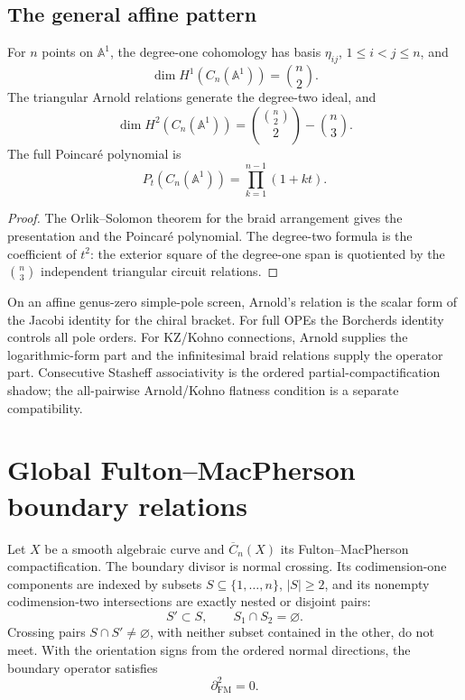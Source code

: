 \subsection{\texorpdfstring{The general affine pattern}{The general affine pattern}}

\begin{theorem}\label{thm:arnold-general-n}
For \(n\) points on \(\mathbb{A}^1\), the degree-one cohomology has
basis \(\eta_{ij}\), \(1\leq i<j\leq n\), and
\[
\dim H^1(C_n(\mathbb{A}^1))=\binom{n}{2}.
\]
The triangular Arnold relations generate the degree-two ideal, and
\[
\dim H^2(C_n(\mathbb{A}^1))
=
\binom{\binom{n}{2}}{2}-\binom{n}{3}.
\]
The full Poincar\'e polynomial is
\[
P_t(C_n(\mathbb{A}^1))=\prod_{k=1}^{n-1}(1+kt).
\]
\end{theorem}

\begin{proof}
The Orlik--Solomon theorem for the braid arrangement gives the
presentation and the Poincar\'e polynomial. The degree-two formula is the
coefficient of \(t^2\): the exterior square of the degree-one span is
quotiented by the \(\binom{n}{3}\) independent triangular circuit
relations.
\end{proof}

\begin{remark}\label{rem:ope-arnold}
On an affine genus-zero simple-pole screen, Arnold's relation is the
scalar form of the Jacobi identity for the chiral bracket. For full
OPEs the Borcherds identity controls all pole orders. For KZ/Kohno
connections, Arnold supplies the logarithmic-form part and the
infinitesimal braid relations supply the operator part. Consecutive
Stasheff associativity is the ordered partial-compactification shadow;
the all-pairwise Arnold/Kohno flatness condition is a separate
compatibility.
\end{remark}

\section{Global Fulton--MacPherson boundary relations}
\label{sec:global-boundary-relations}

\begin{theorem}
\label{thm:config-boundary-relations}
Let \(X\) be a smooth algebraic curve and
\(\overline{C}_n(X)\) its Fulton--MacPherson compactification. The
boundary divisor is normal crossing. Its codimension-one components
are indexed by subsets \(S\subseteq\{1,\ldots,n\}\), \(|S|\geq2\), and
its nonempty codimension-two intersections are exactly nested or
disjoint pairs:
\[
S'\subset S,\qquad
S_1\cap S_2=\varnothing.
\]
Crossing pairs \(S\cap S'\neq\varnothing\), with neither subset
contained in the other, do not meet. With the orientation signs from
the ordered normal directions, the boundary operator satisfies
\[
\partial_{\mathrm{FM}}^2=0.
\]
\end{theorem}

